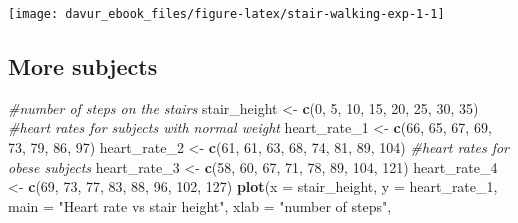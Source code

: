 \documentclass[]{book}
\newenvironment{Shaded}{\begin{snugshade}}{\end{snugshade}}
\newcommand{\CommentTok}[1]{\textcolor[rgb]{0.56,0.35,0.01}{\textit{#1}}}
\newcommand{\DataTypeTok}[1]{\textcolor[rgb]{0.13,0.29,0.53}{#1}}
\newcommand{\DecValTok}[1]{\textcolor[rgb]{0.00,0.00,0.81}{#1}}
\newcommand{\KeywordTok}[1]{\textcolor[rgb]{0.13,0.29,0.53}{\textbf{#1}}}
\newcommand{\NormalTok}[1]{#1}
\newcommand{\StringTok}[1]{\textcolor[rgb]{0.31,0.60,0.02}{#1}}
\begin{document}
\begin{center}\texttt{[image: davur\_ebook\_files/figure-latex/stair-walking-exp-1-1]} \end{center}

\hypertarget{more-subjects-1}{%
\subsection{More subjects}\label{more-subjects-1}}

\begin{Shaded}
\begin{Highlighting}[]
\CommentTok{#number of steps on the stairs}
\NormalTok{stair_height <-}\StringTok{ }\KeywordTok{c}\NormalTok{(}\DecValTok{0}\NormalTok{, }\DecValTok{5}\NormalTok{, }\DecValTok{10}\NormalTok{, }\DecValTok{15}\NormalTok{, }\DecValTok{20}\NormalTok{, }\DecValTok{25}\NormalTok{, }\DecValTok{30}\NormalTok{, }\DecValTok{35}\NormalTok{)}
\CommentTok{#heart rates for subjects with normal weight}
\NormalTok{heart_rate_}\DecValTok{1}\NormalTok{ <-}\StringTok{ }\KeywordTok{c}\NormalTok{(}\DecValTok{66}\NormalTok{, }\DecValTok{65}\NormalTok{, }\DecValTok{67}\NormalTok{, }\DecValTok{69}\NormalTok{, }\DecValTok{73}\NormalTok{, }\DecValTok{79}\NormalTok{, }\DecValTok{86}\NormalTok{, }\DecValTok{97}\NormalTok{)}
\NormalTok{heart_rate_}\DecValTok{2}\NormalTok{ <-}\StringTok{ }\KeywordTok{c}\NormalTok{(}\DecValTok{61}\NormalTok{, }\DecValTok{61}\NormalTok{, }\DecValTok{63}\NormalTok{, }\DecValTok{68}\NormalTok{, }\DecValTok{74}\NormalTok{, }\DecValTok{81}\NormalTok{, }\DecValTok{89}\NormalTok{, }\DecValTok{104}\NormalTok{)}
\CommentTok{#heart rates for obese subjects}
\NormalTok{heart_rate_}\DecValTok{3}\NormalTok{ <-}\StringTok{ }\KeywordTok{c}\NormalTok{(}\DecValTok{58}\NormalTok{, }\DecValTok{60}\NormalTok{, }\DecValTok{67}\NormalTok{, }\DecValTok{71}\NormalTok{, }\DecValTok{78}\NormalTok{, }\DecValTok{89}\NormalTok{, }\DecValTok{104}\NormalTok{, }\DecValTok{121}\NormalTok{)}
\NormalTok{heart_rate_}\DecValTok{4}\NormalTok{ <-}\StringTok{ }\KeywordTok{c}\NormalTok{(}\DecValTok{69}\NormalTok{, }\DecValTok{73}\NormalTok{, }\DecValTok{77}\NormalTok{, }\DecValTok{83}\NormalTok{, }\DecValTok{88}\NormalTok{, }\DecValTok{96}\NormalTok{, }\DecValTok{102}\NormalTok{, }\DecValTok{127}\NormalTok{)}
\KeywordTok{plot}\NormalTok{(}\DataTypeTok{x =}\NormalTok{ stair_height,}
    \DataTypeTok{y =}\NormalTok{ heart_rate_}\DecValTok{1}\NormalTok{,}
    \DataTypeTok{main =} \StringTok{"Heart rate vs stair height"}\NormalTok{,}
    \DataTypeTok{xlab =} \StringTok{"number of steps"}\NormalTok{,}

\end{Highlighting}
\end{Shaded}
\end{document}
